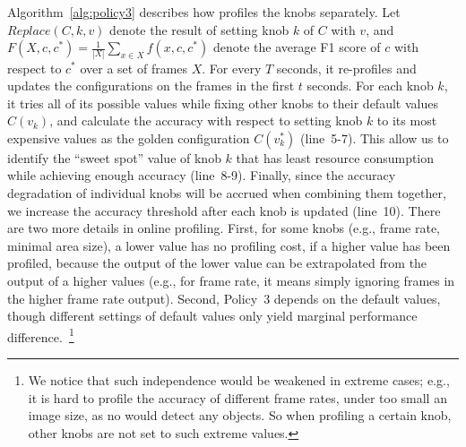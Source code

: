 Algorithm~\ref{alg:policy3} describes how \name profiles the knobs
separately. 
Let $Replace(C,k,v)$ denote the result of setting knob $k$ of $C$ 
with $v$, and $F(X,c,c^*)=\frac{1}{|X|}\sum_{x\in X}f(x,c,c^*)$ 
denote the average F1 score of $c$ with respect to $c^*$ over a 
set of frames $X$.
For every $T$ seconds, it re-profiles and updates the 
configurations on the frames in the first $t$ seconds.
For each knob $k$, it tries all of its possible values while 
fixing other knobs to their default values $C(v_k)$, and calculate
the accuracy with respect to setting knob $k$ to its most 
expensive values as the golden
configuration $C(v_k^*)$ (line~5-7). 
This allow us to identify the ``sweet spot'' value of knob $k$ 
that has least resource consumption while achieving enough 
accuracy (line~8-9).
Finally, since the accuracy degradation of individual knobs will 
be accrued when combining them together, we increase the accuracy 
threshold after each knob is updated (line~10).
There are two more details in online profiling.
First, for some knobs (e.g., frame rate, minimal area size), a
lower value has no profiling cost, if a higher value has been
profiled, because the output of the lower value can be extrapolated
from the output of a higher values (e.g., for frame rate, it means
simply ignoring frames in the higher frame rate output).
Second, Policy~3 depends on the default values, though different
settings of default values only yield marginal performance 
difference.~\footnote{We notice that such independence would be 
weakened in extreme cases; e.g., it is hard to profile the accuracy
of different frame rates, under too small an image size, as no \nn
would detect any objects. So when profiling a certain knob, other
knobs are not set to such extreme values.}
